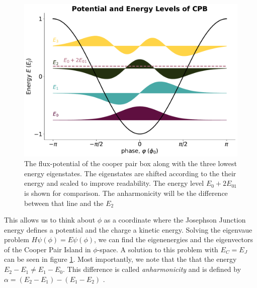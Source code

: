 \begin{figure}
    \centering
    \includegraphics[width=0.80\linewidth]{Figs/Theory/CPB_potential.pdf}
    \caption{The flux-potential of the cooper pair box along with the three lowest energy eigenstates. The eigenstates are shifted according to the their energy and scaled to improve readability. The energy level $E_0 + 2E_{01}$ is shown for comparison. The anharmonicity will be the difference between that line and the $E_2$}
    \label{fig:cooper_pair_box_energy_levels}
\end{figure}


This allows us to think about $\phi$ as a coordinate where the Josephson Junction energy defines a potential and the charge a kinetic energy. Solving the eigenvaue problem $H\psi(\phi) = E \psi(\phi)$, we can find the eigenenergies and the eigenvectors of the Cooper Pair Island in $\phi$-space. A solution to this problem with $E_C = E_J$ can be seen in figure \ref{fig:cooper_pair_box_energy_levels}. Most importantly, we note that the that the energy $E_2-E_1 \neq E_1 - E_0$. This difference is called \textit{anharmonicity} and is defined by $\alpha = (E_2 - E_1) - (E_1 - E_2)$ \cite{krantz_week_2019}.

